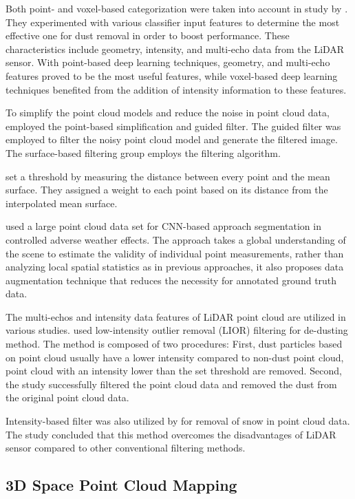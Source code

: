 Both point- and voxel-based categorization were taken into account in study by \citet{stanislas2021}. They experimented with various classifier input features to determine the most effective one for dust removal in order to boost performance. These characteristics include geometry, intensity, and multi-echo data from the LiDAR sensor. With point-based deep learning techniques, geometry, and multi-echo features proved to be the most useful features, while voxel-based deep learning techniques benefited from the addition of intensity information to these features.

To simplify the point cloud models and reduce the noise in point cloud data, \citet{zhu2020} employed the point-based simplification and guided filter. The guided filter was employed to filter the noisy point cloud model and generate the filtered image. The surface-based filtering group employs the filtering algorithm.

\citet{ramiya2017} set a threshold by measuring the distance between every point and the mean surface. They assigned a weight to each point based on its distance from the interpolated mean surface.

\citet{heinzler2020} used a large point cloud data set for CNN-based approach segmentation in controlled adverse weather effects. The approach takes a global understanding of the scene to estimate the validity of individual point measurements, rather than analyzing local spatial statistics as in previous approaches, it also proposes data augmentation technique that reduces the necessity for annotated ground truth data.

The multi-echos and intensity data features of LiDAR point cloud are utilized in various studies. \citet{afzalaghaeinaeini2021} used low-intensity outlier removal (LIOR) filtering for de-dusting method. The method is composed of two procedures: First, dust particles based on point cloud usually have a lower intensity compared to non-dust point cloud, point cloud with an intensity lower than the set threshold are removed. Second,  the study successfully filtered the point cloud data and removed the dust from the original point cloud data.

Intensity-based filter was also utilized by \citet{park2020} for removal of snow in point cloud data. The study concluded that this method overcomes the disadvantages of LiDAR sensor compared to other conventional filtering methods.

\subsection{3D Space Point Cloud Mapping}

